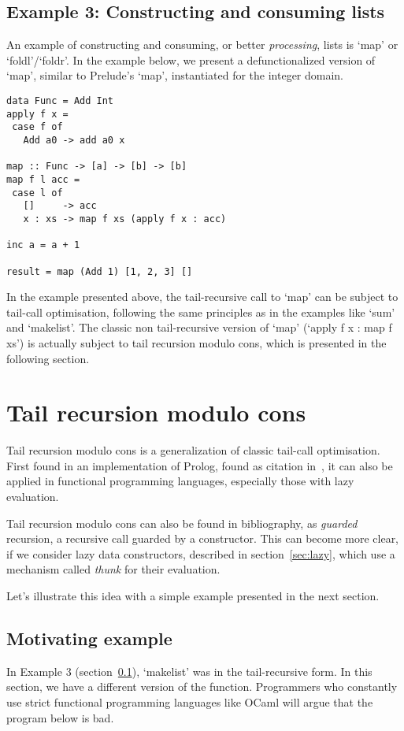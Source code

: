 \documentclass[diploma]{softlab-thesis}
\begin{document}
\subsection {Example 3: Constructing and consuming lists}
\label{sec:example3}

An example of constructing and consuming, or better \textit{processing}, lists is `map' or `foldl'/`foldr'.
In the example below, we present a defunctionalized version of `map', similar to Prelude's `map', instantiated for
the integer domain.

\begin{verbatim}
data Func = Add Int
apply f x =
 case f of
   Add a0 -> add a0 x

map :: Func -> [a] -> [b] -> [b]
map f l acc =
 case l of
   []     -> acc
   x : xs -> map f xs (apply f x : acc)

inc a = a + 1

result = map (Add 1) [1, 2, 3] []
\end{verbatim}
In the example presented above, 
the tail-recursive call to `map' can be subject to tail-call optimisation, 
following the same principles as in the examples like `sum' and `makelist'. The classic non tail-recursive 
version of `map' (`apply f x : map f xs') is actually subject to tail recursion modulo cons, which is presented 
in the following section.

\section{Tail recursion modulo cons}
\label{sec:modulo-cons-example}

Tail recursion modulo cons is a generalization of classic tail-call optimisation. First found in an 
implementation of Prolog, found as citation in~\cite{Wadler84}, it can also be applied in 
functional programming languages, especially those with lazy evaluation. 

Tail recursion modulo cons can also be found in bibliography, as \textit{guarded} recursion, 
a recursive call guarded by a constructor. This can become more clear, if we consider lazy data constructors, 
described in section~\ref{sec:lazy}, which use a mechanism called \textit{thunk} for their evaluation.

Let's illustrate this idea with a simple example presented in the next section.

\subsection {Motivating example}
In Example 3 (section~\ref{sec:example3}), `makelist' was in the tail-recursive 
form. In this section, we have a different version of the function. 
Programmers who constantly use strict functional programming languages like OCaml 
will argue that the program below is bad. 
\end{document}

